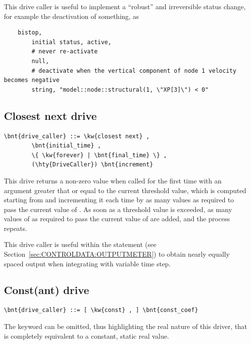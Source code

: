 This drive caller is useful to implement a ``robust'' and irreversible status change, for example the deactivation of something, as
\begin{verbatim}
    bistop,
        initial status, active,
        # never re-activate
        null,
        # deactivate when the vertical component of node 1 velocity becomes negative
        string, "model::node::structural(1, \"XP[3]\") < 0"
\end{verbatim}

\subsection{Closest next drive}
\label{sec:DriveCaller:CLOSEST_NEXT}
\begin{Verbatim}[commandchars=\\\{\}]
    \bnt{drive_caller} ::= \kw{closest next} ,
        \bnt{initial_time} ,
        \{ \kw{forever} | \bnt{final_time} \} ,
        (\hty{DriveCaller}) \bnt{increment}
\end{Verbatim}
This drive returns a non-zero value when called for the first time
with an argument greater that or equal to the current threshold value,
which is computed starting from  and incrementing
it each time by as many  values as required to pass
the current value of .
As soon as a threshold value is exceeded, as many values of 
as required to pass the current value of  are added,
and the process repeats.

This drive caller is useful within the  statement
(see Section~\ref{sec:CONTROLDATA:OUTPUTMETER})
to obtain nearly equally spaced output when integrating
with variable time step.

\subsection{Const(ant) drive}
\begin{Verbatim}[commandchars=\\\{\}]
    \bnt{drive_caller} ::= [ \kw{const} , ] \bnt{const_coef}
\end{Verbatim}
The keyword  can be omitted, thus highlighting the real nature
of this driver, that is completely equivalent to a constant, static real
value.

